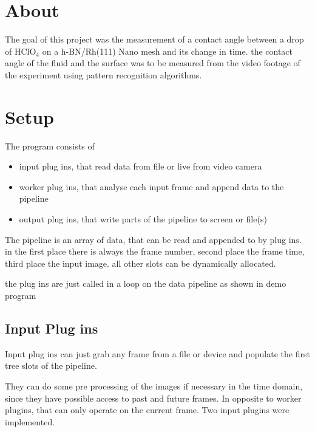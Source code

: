 \section{About}

The goal of this project was the measurement of a contact angle between a drop of HClO$_4$ on a h-BN/Rh(111) Nano mesh and its change in time.
the contact angle of the fluid and the surface was to be measured from the video footage of the experiment using pattern recognition algorithms.



\section{Setup}

The program consists of


\begin{itemize}
	\item input plug ins, that read data from file or live from video camera
	\item worker plug ins, that analyse each input frame and append data to the pipeline
	\item output plug ins, that write parts of the pipeline to screen or file(s)
\end{itemize}

The pipeline is an array of data, that can be read and appended to by plug ins. in the first place there is always the frame number, second place the frame time, third place the input image. all other slots can be dynamically allocated.

the plug ins are just called in a loop on the data pipeline as shown in demo program



\subsection{Input Plug ins}
Input plug ins can just grab any frame from a file or device and populate the first tree slots of the pipeline.

They can do some pre processing of the images if necessary in the time domain, since they have possible access to past and future frames.
In opposite to worker plugins, that can only operate on the current frame.
Two input plugins were implemented.

\subsubsection[inpSimpleFrameGrabber]{}

